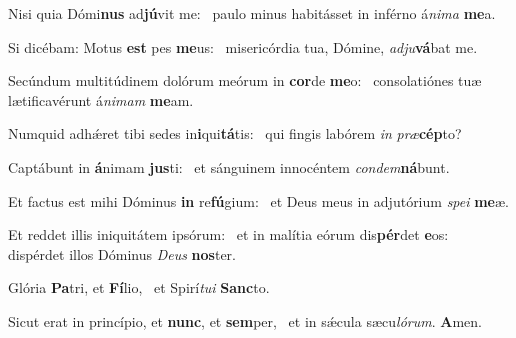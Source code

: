 \item Nisi quia Dómi\textbf{nus} ad\textbf{jú}vit me:~\psstar{} paulo minus habitásset in inférno á\textit{ni}\textit{ma} \textbf{me}a.
\item Si dicébam: Motus \textbf{est} pes \textbf{me}us:~\psstar{} misericórdia tua, Dómine, \textit{ad}\textit{ju}\textbf{vá}bat me.
\item Secúndum multitúdinem dolórum meórum in \textbf{cor}de \textbf{me}o:~\psstar{} consolatiónes tuæ lætificavérunt á\textit{ni}\textit{mam} \textbf{me}am.
\item Numquid adhǽret tibi sedes in\textbf{i}qui\textbf{tá}tis:~\psstar{} qui fingis labórem \textit{in} \textit{præ}\textbf{cép}to?
\item Captábunt in \textbf{á}nimam \textbf{jus}ti:~\psstar{} et sánguinem innocéntem \textit{con}\textit{dem}\textbf{ná}bunt.
\item Et factus est mihi Dóminus \textbf{in} re\textbf{fú}gium:~\psstar{} et Deus meus in adjutórium \textit{spe}\textit{i} \textbf{me}æ.
\item Et reddet illis iniquitátem ipsórum:~\pscross{} et in malítia eórum dis\textbf{pér}det \textbf{e}os:~\psstar{} dispérdet illos Dóminus \textit{De}\textit{us} \textbf{nos}ter.
\item Glória \textbf{Pa}tri, et \textbf{Fí}lio,~\psstar{} et Spirí\textit{tu}\textit{i} \textbf{Sanc}to.
\item Sicut erat in princípio, et \textbf{nunc}, et \textbf{sem}per,~\psstar{} et in sǽcula sæcu\textit{ló}\textit{rum}. \textbf{A}men.
